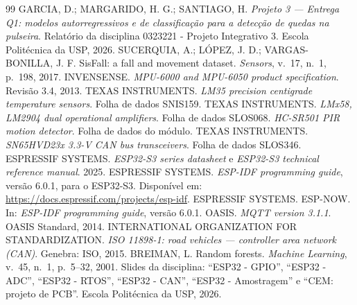 \begin{thebibliography}{99}
 GARCIA, D.; MARGARIDO, H. G.; SANTIAGO, H. \emph{Projeto 3 --- Entrega Q1:
  modelos autorregressivos e de classificação para a detecção de quedas na pulseira}.
  Relatório da disciplina 0323221 - Projeto Integrativo 3. Escola Politécnica da USP, 2026.
 SUCERQUIA, A.; LÓPEZ, J. D.; VARGAS-BONILLA, J. F. SisFall: a fall
  and movement dataset. \emph{Sensors}, v.~17, n.~1, p.~198, 2017.
 INVENSENSE. \emph{MPU-6000 and MPU-6050 product specification}.
  Revisão 3.4, 2013.
 TEXAS INSTRUMENTS. \emph{LM35 precision centigrade temperature sensors}.
  Folha de dados SNIS159.
 TEXAS INSTRUMENTS. \emph{LMx58, LM2904 dual operational amplifiers}.
  Folha de dados SLOS068.
 \emph{HC-SR501 PIR motion detector}. Folha de dados do módulo.
 TEXAS INSTRUMENTS. \emph{SN65HVD23x 3.3-V CAN bus transceivers}.
  Folha de dados SLOS346.
 ESPRESSIF SYSTEMS. \emph{ESP32-S3 series datasheet} e \emph{ESP32-S3
  technical reference manual}. 2025.
 ESPRESSIF SYSTEMS. \emph{ESP-IDF programming guide}, versão 6.0.1, para o
  ESP32-S3. Disponível em: \url{https://docs.espressif.com/projects/esp-idf}.
 ESPRESSIF SYSTEMS. ESP-NOW. In: \emph{ESP-IDF programming guide}, versão
  6.0.1.
 OASIS. \emph{MQTT version 3.1.1}. OASIS Standard, 2014.
 INTERNATIONAL ORGANIZATION FOR STANDARDIZATION. \emph{ISO 11898-1: road
  vehicles --- controller area network (CAN)}. Genebra: ISO, 2015.
 BREIMAN, L. Random forests. \emph{Machine Learning}, v.~45, n.~1,
  p.~5--32, 2001.
 Slides da disciplina: ``ESP32 - GPIO'', ``ESP32 - ADC'', ``ESP32 - RTOS'',
  ``ESP32 - CAN'', ``ESP32 - Amostragem'' e ``CEM: projeto de PCB''. Escola Politécnica da
  USP, 2026.
\end{thebibliography}
